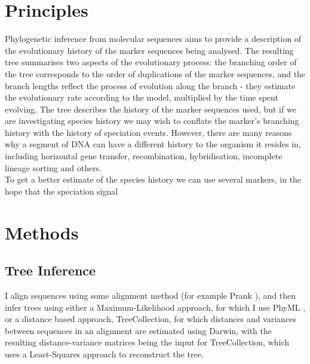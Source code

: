 \documentclass[10pt]{article}
\begin{document}
\section{Principles}
Phylogenetic inference from molecular sequences aims to provide a description of the evolutionary history of the marker sequences being analysed. The resulting tree summarises two aspects of the evolutionary process: the branching order of the tree corresponds to the order of duplications of the marker sequences, and the branch lengths reflect the process of evolution along the branch - they estimate the evolutionary rate according to the model, multiplied by the time spent evolving. The tree describes the history of the marker sequences used, but if we are investigating species history we may wish to conflate the marker's branching history with the history of speciation events. However, there are many reasons why a segment of DNA can have a different history to the organism it resides in, including horizontal gene transfer, recombination, hybridisation, incomplete lineage sorting and others.\\
To get a better estimate of the species history we can use several markers, in the hope that the speciation signal 


\section{Methods}

\subsection{Tree Inference}
I align sequences using some alignment method (for example Prank \citep{Loytynoja:2005cb}), and then infer trees using either a Maximum-Likelihood approach, for which I use PhyML \citep{Guindon:2010gf}, or a distance based approach, TreeCollection, for which distances and variances between sequences in an alignment are estimated using Darwin, with the resulting distance-variance matrices being the input for TreeCollection, which uses a Least-Squares approach to reconstruct the tree.

\end{document}
